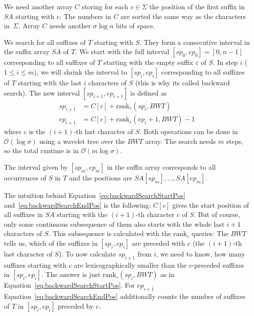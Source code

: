 \begin{Proof}
  We need another array $C$ storing for each $c \in \Sigma$ the position of the first suffix in~$SA$ starting with $c$. The numbers in $C$ are sorted the same way as the characters in~$\Sigma$. Array $C$ needs another $\sigma\log n$ bits of space.

  We search for all suffixes of $T$ starting with $S$. They form a consecutive interval in the suffix array $SA$ of $T$. We start with the full interval $[sp_0,ep_0]=[0,n-1]$ corresponding to all suffixes of $T$ starting with the empty suffix $\varepsilon$ of $S$. In step $i$ ($1 \leq i \leq m$), we will shrink the interval to $[sp_i,ep_i]$ corresponding to all suffixes of $T$ starting with the last $i$ characters of $S$ (this is why its called backward search). The new interval $[sp_{i+1},ep_{i+1}]$ is defined as
  \begin{align}
    sp_{i+1} &= C[c] + \mathrm{rank}_c(sp_i, BWT)
    \label{eq:backwardSearchStartPos} \\
    ep_{i+1} &= C[c] + \mathrm{rank}_c(ep_i + 1, BWT) - 1
    \label{eq:backwardSearchEndPos}
  \end{align}
  where $c$ is the $(i+1)$-th last character of $S$. Both operations can be done in $\mathcal{O}(\log\sigma)$ using a wavelet tree over the $BWT$ array. The search needs $m$ steps, so the total runtime is in $\mathcal{O}(m\log\sigma)$.

  The interval given by $[sp_m,ep_m]$ in the suffix array corresponds to all occurrences of $S$ in $T$ and the positions are $SA[sp_m], \ldots, SA[ep_m]$.
\end{Proof}

The intuition behind Equation~\ref{eq:backwardSearchStartPos} and~\ref{eq:backwardSearchEndPos} is the following: $C[c]$ gives the start position of all suffixes in $SA$ starting with the $(i+1)$-th character $c$ of $S$. But of course, only some continuous subsequence of them also starts with the whole last $i+1$ characters of $S$. This subsequence is calculated with the $\mathrm{rank}_c$ queries: The $BWT$ tells us, which of the suffixes in $[sp_i,ep_i]$ are preceded with $c$ (the $(i+1)$-th last character of $S$). To now calculate $sp_{i+1}$ from $i$, we need to know, how many suffixes starting with $c$ are lexicographically smaller than the $c$-preceded suffixes in $[sp_i,ep_i]$. The answer is just $\mathrm{rank}_c(sp_i, BWT)$ as in Equation~\ref{eq:backwardSearchStartPos}. For $ep_{i+1}$ Equation~\ref{eq:backwardSearchEndPos} additionally counts the number of suffixes of $T$ in $[sp_i,ep_i]$ preceded by $c$.

